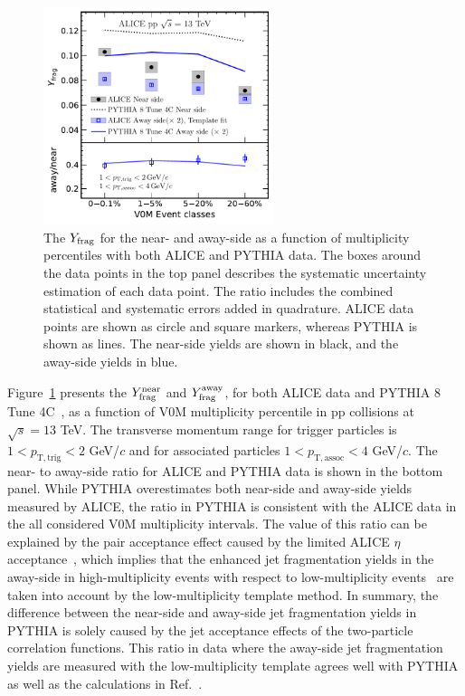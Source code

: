 \begin{figure}[h!]
	\centering
	\hspace{-3em}\includegraphics[width=0.6\textwidth]{figures/FIG3_Plot_v2Mult.pdf} 
	\caption{The $Y_{\rm{frag}}$ for the near- and away-side as a function of multiplicity percentiles with both ALICE and PYTHIA data. The boxes around the data points in the top panel describes the systematic uncertainty estimation of each data point. The ratio includes the combined statistical and systematic errors added in quadrature. ALICE data points are shown as circle and square markers, whereas PYTHIA is shown as lines. The near-side yields are shown in black, and the away-side yields in blue.}
	\label{fig:Ymult}
\end{figure}

Figure~\ref{fig:Ymult} presents the $Y^{\mathrm{near}}_{\rm{frag}}$ and $Y^{\mathrm{away}}_{\rm{frag}}$, for both ALICE data and PYTHIA 8 Tune 4C~\cite{Skands:2014pea}, as a function of V0M multiplicity percentile in pp collisions at $\sqrt{s}=13$ TeV. The transverse momentum range for trigger particles is $1<p_\mathrm{T,trig}<2$ GeV/$c$ and for associated particles $1<p_\mathrm{T,assoc}<4$ GeV/$c$.
The near- to away-side ratio for ALICE and PYTHIA data is shown in the bottom panel. While PYTHIA overestimates both near-side and away-side yields measured by ALICE, the ratio in PYTHIA is consistent with the ALICE data in the all considered V0M multiplicity intervals. The value of this ratio can be explained by the pair acceptance effect caused by the limited ALICE $\eta$ acceptance~\cite{PHENIX:2006gto}, which implies that the enhanced jet fragmentation yields in the away-side in high-multiplicity events with respect to low-multiplicity events~\cite{ALICE:2013tla,ALICE:2014mas} are taken into account by the low-multiplicity template method. In summary, the difference between the near-side and away-side jet fragmentation yields in PYTHIA is solely caused by the jet acceptance effects of the two-particle correlation functions. This ratio in data where the away-side jet fragmentation yields are measured with the low-multiplicity template agrees well with PYTHIA as well as the calculations in Ref.~\cite{PHENIX:2006gto}.

